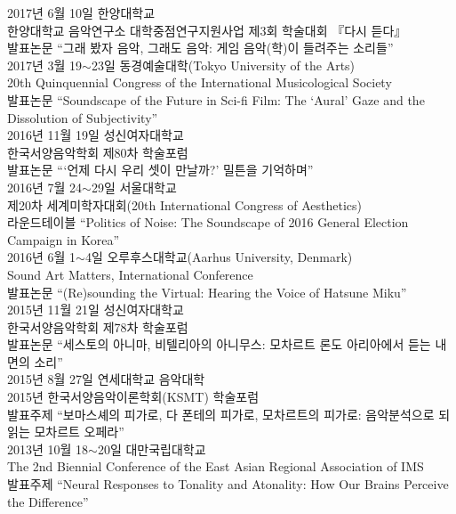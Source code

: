 \documentclass[dvipdfmx,a4paper]{article}
\begin{document}
  \noindent 2017년 6월 10일 한양대학교\\
  한양대학교 음악연구소 대학중점연구지원사업 제3회 학술대회 『다시 듣다』\\
  발표논문 “그래 봤자 음악, 그래도 음악: 게임 음악(학)이 들려주는 소리들”\\
  
  \noindent 2017년 3월 19$\sim$23일 동경예술대학(Tokyo University of the Arts)\\
  20th Quinquennial Congress of the International Musicological Society\\
  발표논문 “Soundscape of the Future in Sci-fi Film: The ‘Aural’ Gaze and the Dissolution of Subjectivity”\\
  
  \noindent 2016년 11월 19일 성신여자대학교\\
  한국서양음악학회 제80차 학술포럼\\
  발표논문 “‘언제 다시 우리 셋이 만날까?’ 밀튼을 기억하며”\\
  
  \noindent 2016년 7월 24$\sim$29일 서울대학교\\
  제20차 세계미학자대회(20th International Congress of Aesthetics)\\
  라운드테이블 “Politics of Noise: The Soundscape of 2016 General Election Campaign in Korea”\\
  
  \noindent 2016년 6월 1$\sim$4일 오루후스대학교(Aarhus University, Denmark)\\
  Sound Art Matters, International Conference\\
  발표논문 “(Re)sounding the Virtual: Hearing the Voice of Hatsune Miku”\\
  
  \noindent 2015년 11월 21일 성신여자대학교\\
  한국서양음악학회 제78차 학술포럼\\
  발표논문 “세스토의 아니마, 비텔리아의 아니무스: 모차르트 론도 아리아에서 듣는 내면의 소리”\\
  
  \noindent 2015년 8월 27일 연세대학교 음악대학\\
  2015년 한국서양음악이론학회(KSMT) 학술포럼\\
  발표주제 “보마스셰의 피가로, 다 폰테의 피가로, 모차르트의 피가로: 음악분석으로 되읽는 모차르트 오페라”\\
  
  \noindent 2013년 10월 18$\sim$20일 대만국립대학교\\
  The 2nd Biennial Conference of the East Asian Regional Association of IMS\\
  발표주제 “Neural Responses to Tonality and Atonality: How Our Brains Perceive the Difference”\\
  
\end{document}
